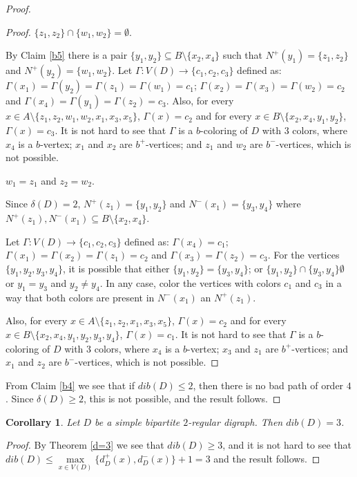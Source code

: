 \documentclass[12pt]{article}
\newtheorem{corollary}[theorem]{Corollary}
\begin{document}
\begin{proof}
\begin{proof}
 $\{z_1, z_2\}\cap \{w_1, w_2\}=\emptyset$.

\noindent By Claim \ref{b5} there is a pair  $\{y_1, y_2\}\subseteq B\setminus \{x_2, x_4\}$ such that $N^+(y_1) = \{z_1, z_2\}$ and $N^+(y_2) = \{w_1, w_2\}$. Let $\Gamma: V(D) \rightarrow \{c_1, c_2, c_3\}$ defined as: $\Gamma(x_1) =\Gamma(y_2) = \Gamma(z_1) = \Gamma(w_1) = c_1$; $\Gamma(x_2)  = \Gamma(x_3)  = \Gamma(w_2) = c_2$ and $\Gamma(x_4) = \Gamma(y_1) = \Gamma(z_2) = c_3$.  Also, for every $x\in A\setminus\{z_1, z_2, w_1, w_2, x_1, x_3, x_5\}$, $\Gamma(x) = c_2$ and for every $x\in B\setminus\{x_2, x_4, y_1, y_2\}$, $\Gamma(x) = c_3$. It is not hard to see that $\Gamma$ is a $b$-coloring of $D$ with 3 colors, where  $x_4$ is a  $b$-vertex;  $x_1$ and $x_2$ are $b^+$-vertices; and $z_1$ and $w_2$  are $b^-$-vertices, which is not possible.

 $w_1= z_1$ and $z_2=w_2$.

\noindent Since $\delta(D) = 2$, $N^+(z_1)= \{y_1, y_2\}$ and $N^-(x_1)= \{y_3, y_4\}$ where $N^+(z_1), N^-(x_1) \subseteq B\setminus \{x_2, x_4\}$. 

Let $\Gamma: V(D) \rightarrow \{c_1, c_2, c_3\}$ defined as: $\Gamma(x_4)  = c_1$; $\Gamma(x_1)  = \Gamma(x_2)  = \Gamma(z_1) = c_2$ and $\Gamma(x_3) = \Gamma(z_2) = c_3$.  For the vertices $\{y_1, y_2, y_3, y_4\}$, it is possible that either $\{y_1,y_2\}= \{y_3, y_4\}$; or $\{y_1,y_2\}\cap \{y_3, y_4\}\emptyset$ or $y_1=y_3$ and $y_2\not=y_4$. In any case, color the vertices with colors $c_1$ and $c_3$ in a way that both colors are present in $N^-(x_1)$ an $N^+(z_1)$. 

Also, for every $x\in A\setminus\{z_1, z_2, x_1, x_3, x_5\}$, $\Gamma(x) = c_2$ and for every $x\in B\setminus\{x_2, x_4, y_1, y_2, y_3, y_4\}$, $\Gamma(x) = c_1$. It is not hard to see that $\Gamma$ is a $b$-coloring of $D$ with 3 colors, where  $x_4$ is a  $b$-vertex;  $x_3$ and $z_1$ are $b^+$-vertices; and $x_1$ and $z_2$  are $b^-$-vertices, which is not possible. \end{proof}

From Claim \ref{b4} we see that if $dib(D)\leq 2$, then there is no bad path of order $4$. Since $\delta(D)\geq 2$, this is not possible, and the result follows. 

\end{proof}


\begin{corollary} Let $D$ be a simple bipartite $2$-regular digraph. Then $dib(D) = 3$.
\end{corollary}
\begin{proof} By Theorem \ref{d=3} we see that $dib(D)\geq 3$, and it is not hard to see that $dib(D)\leq \max\limits_{x\in V(D)}\{d^+_D(x), d^-_D(x)\}+1 = 3$ and the result follows. 
    \end{proof}
\end{document}
